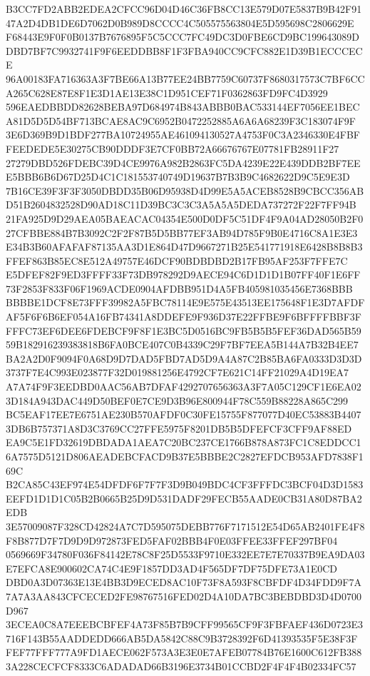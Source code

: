\documentclass[UTF8,fontset=fandol,zihao=-4,a4paper]{ctexart}
\begin{document}
{{B3CC7FD2ABB2EDEA2CFCC96D04D46C36FB8CC13E579D07E5837B9B42F9147A2D4DB1DE6D7062D0B989D8CCCC4C505575563804E5D595698C2806629E
F68443E9F0F0B0137B7676895F5C5CCC7FC49DC3D0FBE6CD9BC199643089DDBD7BF7C9932741F9F6EEDDBB8F1F3FBA940CC9CFC882E1D39B1ECCCECE
96A00183FA716363A3F7BE66A13B77EE24BB7759C60737F8680317573C7BF6CCA265C628E87E8F1E3D1AE13E38C1D951CEF71F0362863FD9FC4D3929
596EAEDBBDD82628BEBA97D684974B843ABBB0BAC533144EF7056EE1BECA81D5D5D54BF713BCAE8AC9C6952B0472252885A6A6A68239F3C183074F9F
3E6D369B9D1BDF277BA10724955AE461094130527A4753F0C3A2346330E4FBFFEEDEDE5E30275CB90DDDF3E7CF0BB72A66676767E07781FB28911F27
27279DBD526FDEBC39D4CE9976A982B2863FC5DA4239E22E439DDB2BF7EEE5BBB6B6D67D25D4C1C181553740749D19637B7B3B9C4682622D9C5E9E3D
7B16CE39F3F3F3050DBDD35B06D95938D4D99E5A5ACEB8528B9CBCC356ABD51B2604832528D90AD18C11D39BC3C3C3A5A5A5DEDA737272F22F7FF94B
21FA925D9D29AEA05BAEACAC04354E500D0DF5C51DF4F9A04AD28050B2F027CFBBE884B7B3092C2F2F87B5D5BB77EF3AB94D785F9B0E4716C8A1E3E3
E34B3B60AFAFAF87135AA3D1E864D47D9667271B25E541771918E6428B8B8B3FFEF863B85EC8E512A49757E46DCF90BDBDBD2B17FB95AF253F7FFE7C
E5DFEF82F9ED3FFFF33F73DB978292D9AECE94C6D1D1D1B07FF40F1E6FF73F2853F833F06F1969ACDE0904AFDBB951D4A5FB405981035456E7368BBB
BBBBE1DCF8E73FFF39982A5FBC78114E9E575E43513EE175648F1E3D7AFDFAF5F6F6B6EF054A16FB74341A8DDEFE9F936D37E22FFBE9F6BFFFFBBF3F
FFFC73EF6DEE6FDEBCF9F8F1E3BC5D0516BC9FB5B5B5FEF36DAD565B5959B182916239383818B6FA0BCE407C0B4339C29F7BF7EEA5B144A7B32B4EE7
BA2A2D0F9094F0A68D9D7DAD5FBD7AD5D9A4A87C2B85BA6FA0333D3D3D3737F7E4C993E023877F32D019881256E4792CF7E621C14FF21029A4D19EA7
A7A74F9F3EEDBD0AAC56AB7DFAF4292707656363A3F7A05C129CF1E6EA023D184A943DAC449D50BEF0E7CE9D3B96E800944F78C559B88228A865C299
BC5EAF17EE7E6751AE230B570AFDF0C30FE15755F877077D40EC53883B44073DB6B757371A8D3C3769CC27FFE5975F8201DB5B5DFEFCF3CFF9AF88ED
EA9C5E1FD32619DBDADA1AEA7C20BC237CE1766B878A873FC1C8EDDCC16A7575D5121D806AEADEBCFACD9B37E5BBBE2C2827EFDCB953AFD7838F169C
B2CA85C43EF974E54DFDF6F7F7F3D9B049BDC4CF3FFFDC3BCF04D3D1583EEFD1D1D1C05B2B0665B25D9D531DADF29FECB55AADE0CB31A80D87BA2EDB
3E57009087F328CD42824A7C7D595075DEBB776F7171512E54D65AB2401FE4F8F8B877D7F7D9D9D972873FED5FAF02BBB4F0E03FFEE33FFEF297BF04
0569669F34780F036F84142E78C8F25D5533F9710E332EE7E7E70337B9EA9DA03E7EFCA8E900602CA74C4E9F1857DD3AD4F565DF7DF75DFE73A1E0CD
DBD0A3D07363E13E4BB3D9ECED8AC10F73F8A593F8CBFDF4D34FDD9F7A7A7A3AA843CFCECED2FE98767516FED02D4A10DA7BC3BEBDBD3D4D0700D967
3ECEA0C8A7EEEBCBFEF4A73F85B7B9CFF99565CF9F3FBFAEF436D0723E3716F143B55AADDEDD666AB5DA5842C88C9B3728392F6D41393535F5E38F3F
FEF77FFF777A9FD1AECE062F573A3E3E0E7AFEB07784B76E1600C612FB3883A228CECFCF8333C6ADADAD66B3196E3734B01CCBD2F4F4F4B02334FC57
}}
\end{document}
